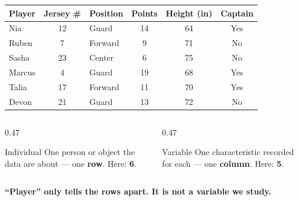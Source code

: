 \documentclass[aspectratio=169, 11pt]{beamer}
\newcommand{\redink}[1]{{\color{redacc}\bfseries #1}}
\begin{document}
\begin{frame}[t, plain]
  \vspace{2pt}
  \begin{center}
    \small
    \renewcommand{\arraystretch}{1.15}
    \begin{tabular}{@{} l c l c c c @{}}
    \hline
    \textbf{Player} & \textbf{Jersey \#} & \textbf{Position} & \textbf{Points} &
      \textbf{Height (in)} & \textbf{Captain} \\
    \hline
    Nia    & 12 & Guard   & 14 & 64 & Yes \\
    Ruben  &  7 & Forward &  9 & 71 & No  \\
    Sasha  & 23 & Center  &  6 & 75 & No  \\
    Marcus &  4 & Guard   & 19 & 68 & Yes \\
    Talia  & 17 & Forward & 11 & 70 & Yes \\
    Devon  & 21 & Guard   & 13 & 72 & No  \\
    \hline
    \end{tabular}
  \end{center}
  \vspace{6pt}
  \begin{columns}[t]
    \begin{column}{0.47\textwidth}
      \begin{block}{Individual}
        One person or object the data are about --- one \textbf{row}. Here: \redink{6}.
      \end{block}
    \end{column}
    \begin{column}{0.47\textwidth}
      \begin{block}{Variable}
        One characteristic recorded for each --- one \textbf{column}. Here: \redink{5}.
      \end{block}
    \end{column}
  \end{columns}
  \vspace{6pt}
  \begin{center}
    {\small\color{cerulean}\bfseries ``Player'' only tells the rows apart. It is not a
    variable we study.}
  \end{center}
\end{frame}
\end{document}
